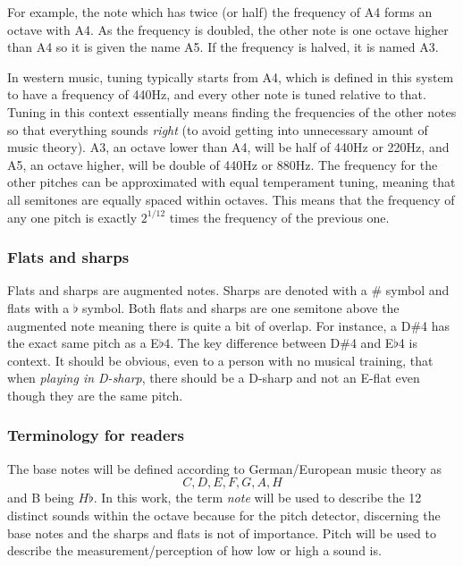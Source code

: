 For example, the note which has twice (or half) the frequency of A4 forms an octave with A4. As the frequency is doubled, the other note is one octave higher than A4 so it is given the name A5. If the frequency is halved, it is named A3. 

In western music, tuning typically starts from A4, which is defined in this system to have a frequency of 440Hz, and every other note is tuned relative to that. Tuning in this context essentially means finding the frequencies of the other notes so that everything sounds \textit{right} (to avoid getting into unnecessary amount of music theory). A3, an octave lower than A4, will be half of 440Hz or 220Hz, and A5, an octave higher, will be double of 440Hz or 880Hz. The frequency for the other pitches can be approximated with equal temperament tuning, meaning that all semitones are equally spaced within octaves. This means that the frequency of any one pitch is exactly $2^{1/12}$ times the frequency of the previous one.  

\subsubsection{Flats and sharps}
Flats and sharps are augmented notes. Sharps are denoted with a $\#$ symbol and flats with a $\flat$ symbol. Both flats and sharps are one semitone above the augmented note meaning there is quite a bit of overlap. For instance, a D$\#$4 has the exact same pitch as a E$\flat$4. The key difference between D$\#$4 and E$\flat$4 is context. It should be obvious, even to a person with no musical training, that when \textit{playing in D-sharp}, there should be a D-sharp and not an E-flat even though they are the same pitch.

\subsubsection{Terminology for readers}
The base notes will be defined according to German/European music theory as \[C, D, E, F, G, A, H\] and B being $H\flat$. In this work, the term \textit{note} will be used to describe the 12 distinct sounds within the octave because for the pitch detector, discerning the base notes and the sharps and flats is not of importance. Pitch will be used to describe the measurement/perception of how low or high a sound is.

